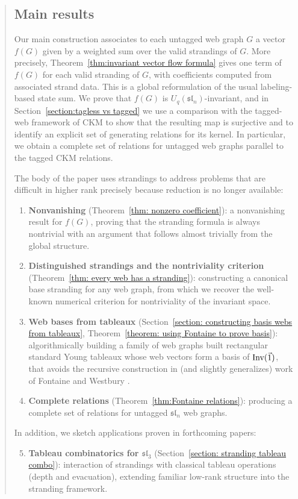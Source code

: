 \documentclass[letterpaper,11pt]{amsart}
\newcommand{\uq}{U_q(\mathfrak{sl}_n)} %
\begin{document}
\begin{abstract}
\subsection*{Main results}
 
Our main construction associates to each untagged web graph $G$ a vector $f(G)$ given by a weighted sum over the valid strandings of $G$. More precisely, Theorem~\ref{thm:invariant vector flow formula} gives one term of $f(G)$ for each valid stranding of $G$, with coefficients computed from associated strand data. This is a global reformulation of the usual labeling-based state sum. We prove that $f(G)$ is $\uq$-invariant, and in Section~\ref{section:tagless vs tagged} we use a comparison with the tagged-web framework of CKM \cite{CKM} to show that the resulting map is surjective and to identify an explicit set of generating relations for its kernel. In particular, we obtain a complete set of relations for untagged web graphs parallel to the tagged CKM relations.
 
The body of the paper uses strandings to address problems that are difficult in higher rank precisely because reduction is no longer available:
 
\begin{enumerate}
    \item \textbf{Nonvanishing} (Theorem~\ref{thm: nonzero coefficient}): a nonvanishing result for $f(G)$, proving that the stranding formula is always nontrivial with an argument that follows almost trivially from the global structure.
 
    \item \textbf{Distinguished strandings and the nontriviality criterion} (Theorem~\ref{thm: every web has a stranding}): constructing a canonical base stranding for any web graph, from which we recover the well-known numerical criterion for nontriviality of the invariant space.
 
    \item \textbf{Web bases from tableaux} (Section~\ref{section: constructing basis webs from tableaux}, Theorem~\ref{theorem: using Fontaine to prove basis}):  algorithmically building a family of web graphs built  rectangular standard Young tableaux whose web vectors form a basis of $\textup{Inv}(\vec{1})$, that avoids the recursive construction in (and slightly generalizes) work of Fontaine \cite{FON} and Westbury \cite{WestburyBases}.
 
    
    \item \textbf{Complete relations} (Theorem~\ref{thm:Fontaine relations}): producing a complete set of relations for untagged $\mathfrak{sl}_n$ web graphs.
\end{enumerate}
In addition, we sketch applications proven in forthcoming papers:
\begin{enumerate} \setcounter{enumi}{4}
    \item \textbf{Tableau combinatorics for $\mathfrak{sl}_3$} (Section~\ref{section: stranding tableau combo}): interaction of strandings with classical tableau operations (depth and evacuation), extending familiar low-rank structure into the stranding framework.
 

\end{enumerate}
\end{abstract}
\end{document}
